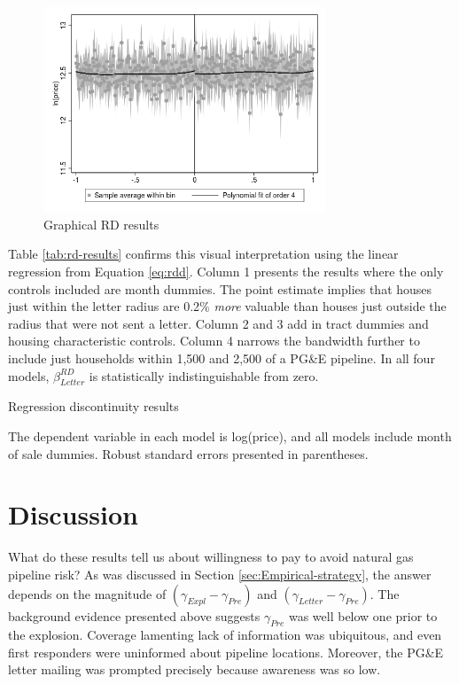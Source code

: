 \documentclass[12pt]{article}
\begin{document}
\begin{figure}[H]
\caption{Graphical RD results\label{fig:Graphical-RD-results}}
\centering{}\includegraphics[width=0.75\textwidth]{../output/rdplot_pge_lnprice}
\end{figure}

Table \ref{tab:rd-results} confirms this visual interpretation using
the linear regression from Equation \ref{eq:rdd}. Column 1 presents
the results where the only controls included are month dummies. The
point estimate implies that houses just within the letter radius are
0.2\% \emph{more }valuable than houses just outside the radius that
were not sent a letter. Column 2 and 3 add in tract dummies and housing
characteristic controls. Column 4 narrows the bandwidth further to
include just households within 1,500 and 2,500 of a PG\&E pipeline.
In all four models, $\beta_{Letter}^{RD}$ is statistically indistinguishable
from zero. 

\begin{table}[H]
\caption{Regression discontinuity results \label{tab:rd-results}}

\footnotesize
\begin{centering}

\par\end{centering}
The dependent variable in each model is log(price), and all models
include month of sale dummies. Robust standard errors presented in
parentheses. 
\end{table}

\section{Discussion\label{sec:Discussion}}

What do these results tell us about willingness to pay to avoid natural gas pipeline risk? As was discussed in Section \ref{sec:Empirical-strategy}, the answer depends on the magnitude of $(\gamma_{Expl}-\gamma_{Pre})$ and $(\gamma_{Letter}-\gamma_{Pre})$. The background evidence presented above suggests $\gamma_{Pre}$ was well below one prior to the explosion. Coverage lamenting lack of information was ubiquitous, and even first responders were uninformed about pipeline locations. Moreover, the PG\&E letter mailing was prompted precisely because awareness was so low. 
\end{document}
